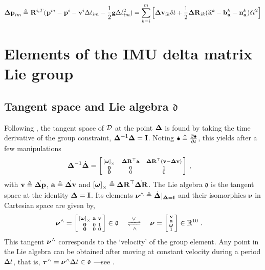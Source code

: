 \begin{equation}
    {\bm \Delta {\bf p}}_{im} \triangleq \prescript{}{}{{\bf R}}_{}^{i,T}(\prescript{}{}{{\bf p}}_{}^m - \prescript{}{}{{\bf p}}_{}^i - \prescript{}{}{{\bf v}}_{}^i \Delta t_{im} - \frac{1}{2} {\bf g} \Delta t_{im}^2) = 
    \sum_{k=i}^{m} \Big[{\bm \Delta {\bf v}}_{ik}\delta t +  \frac{1}{2} {\bm \Delta {\bf R}}_{ik} (\prescript{}{}{\widetilde{{\bf a}}}_{}^k - {\bf b}_{\prescript{}{}{{\bf a}}_{}}^k - {\bf n}_{\prescript{}{}{{\bf a}}_{}}^k)\delta t^2 \Big]
\end{equation}


\section{Elements of the IMU delta matrix Lie group}
\label{sec:IMULieGroup}

\subsection{Tangent space and Lie algebra \texorpdfstring{$\mathfrak{d}$}{d}}
\cite{sola2018micro}
Following \cite{sola2018micro}, the tangent space of $\mathcal{D}$ at the point ${{\bm \Delta}}$ is found by taking the time derivative of the group constraint, ${{\bm \Delta}}^{-1}{{\bm \Delta}} = {\bf I}$.
Noting $\dot{\bullet} \triangleq \frac{\partial\bullet}{\partial t}$, this yields 
after a few manipulations
%
\begin{align}\label{equ:constr}
{{\bm \Delta}}^{-1}\dot{{{\bm \Delta}}} 
&=
\begin{bsmallmatrix}
\left[{{\bm \omega}}\right]_\times & ~~{\bm \Delta {\bf R}}^{\top}{\bf a}~~ & {\bm \Delta {\bf R}}^{\top}({\bf v}-{\bm \Delta {\bf v}}) \\
\bf0 & 0 & 1 \\
\bf0 & 0 & 0 
\end{bsmallmatrix}
~,
\end{align}
%
with ${\bf v} \triangleq \dot{{\bm \Delta {\bf p}}}$, ${\bf a} \triangleq \dot{{\bm \Delta {\bf v}}}$ and $\left[{{\bm \omega}}\right]_\times \triangleq {\bm \Delta {\bf R}}^{\top}\dot{{\bm \Delta {\bf R}}}$.
The Lie algebra $\mathfrak{d}$ is the tangent space at the identity ${{\bm \Delta}}={\bf I}$.
Its elements $\bm\nu^\wedge 
\triangleq \dot{{{\bm \Delta}}} |_{{{\bm \Delta}}={\bf I}}$ and their isomorphics $\bm\nu$ in Cartesian space are given by, %
%
\begin{align}
\bm\nu\hhat 
&=
\begin{bsmallmatrix}
\hatx{\bw} & \bfa & \bfv \\
\bf0 & 0 & 1 \\
\bf0 & 0 & 0 
\end{bsmallmatrix} \in \mathfrak{d}
~~~\xrightleftharpoons[\wedge]{~\vee~}~~~ 
\bm\nu=\begin{bsmallmatrix}
\bfv \\ \bfa \\ \bw \\ 1
\end{bsmallmatrix} \in\bbR^{10}
~.
\end{align}
%
This tangent $\bm\nu^\wedge$ corresponds to the `velocity' of the group element. 
Any point in the Lie algebra can be obtained after moving at constant velocity during a period $\Delta t$, that is, ${\bm \tau}^\wedge=\bm\nu^\wedge\Delta t\in\mathfrak{d}$ ---see .
%

